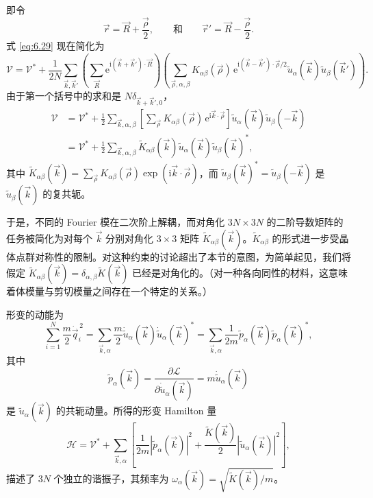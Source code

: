 
即令
\begin{equation*}
\vec r=\vec R+\frac{\vec\rho}2,\qquad\text{和}\qquad\vec r'=\vec R-\frac{\vec\rho}2.
\end{equation*}
式 \eqref{eq:6.29} 现在简化为
\begin{equation}\label{eq:6.30}
\mathcal V=\mathcal V^*+\frac1{2N}\sum_{\vec k,\vec k'}\left(\sum_{\vec R}\mathrm e^{\mathrm i(\vec k+\vec k')\cdot\vec R}\right)\left(\sum_{\vec\rho,\alpha,\beta}K_{\alpha\beta}(\vec\rho)\,\mathrm e^{\mathrm i(\vec k-\vec k')\cdot\vec\rho/2}\tilde u_\alpha(\vec k)\tilde u_\beta(\vec k')\right).
\end{equation}
由于第一个括号中的求和是 $N\delta_{\vec k+\vec k',0}$，
\begin{equation}\label{eq:6.31}
\begin{aligned}
\mathcal V&=\mathcal V^*+\frac12\sum_{\vec k,\alpha,\beta}\left[\sum_{\vec\rho}K_{\alpha\beta}(\vec\rho)\,\mathrm e^{\mathrm i\vec k\cdot\vec\rho}\right]\tilde u_\alpha(\vec k)\tilde u_\beta(-\vec k)\\
&=\mathcal V^*+\frac12\sum_{\vec k,\alpha,\beta}\tilde K_{\alpha\beta}(\vec k)\tilde u_\alpha(\vec k)\tilde u_\beta(\vec k)^*,
\end{aligned}
\end{equation}
其中 $\tilde K_{\alpha\beta}(\vec k)=\sum_{\vec\rho}K_{\alpha\beta}(\vec\rho)\exp(\mathrm i\vec k\cdot\vec\rho)$，而 $\tilde u_\beta(\vec k)^*=\tilde u_\beta(-\vec k)$ 是 $\tilde u_\beta(\vec k)$ 的复共轭。

于是，不同的 Fourier 模在二次阶上解耦，而对角化 $3N\times3N$ 的二阶导数矩阵的任务被简化为对每个 $\vec k$ 分别对角化 $3\times3$ 矩阵 $\tilde K_{\alpha\beta}(\vec k)$。$\tilde K_{\alpha\beta}$ 的形式进一步受晶体点群对称性的限制。对这种约束的讨论超出了本节的意图，为简单起见，我们将假定 $\tilde K_{\alpha\beta}(\vec k)=\delta_{\alpha,\beta}\tilde K(\vec k)$ 已经是对角化的。（对一种各向同性的材料，这意味着体模量与剪切模量之间存在一个特定的关系。）

形变的动能为
\begin{equation}\label{eq:6.32}
\sum_{i=1}^N\frac m2\dot{\vec q}_i^{\,2}=\sum_{\vec k,\alpha}\frac m2\dot{\tilde u}_\alpha(\vec k)\dot{\tilde u}_\alpha(\vec k)^*=\sum_{\vec k,\alpha}\frac1{2m}\tilde p_\alpha(\vec k)\tilde p_\alpha(\vec k)^*,
\end{equation}
其中
\begin{equation*}
\tilde p_\alpha(\vec k)=\frac{\partial\mathscr L}{\partial\dot{\tilde u}_\alpha(\vec k)}=m\dot{\tilde u}_\alpha(\vec k)
\end{equation*}
是 $\tilde u_\alpha(\vec k)$ 的共轭动量。所得的形变 Hamilton 量
\begin{equation}\label{eq:6.33}
\mathscr H=\mathcal V^*+\sum_{\vec k,\alpha}\left[\frac1{2m}\left|\tilde p_\alpha(\vec k)\right|^2+\frac{\tilde K(\vec k)}{2}\left|\tilde u_\alpha(\vec k)\right|^2\right],
\end{equation}
描述了 $3N$ 个独立的谐振子，其频率为 $\omega_\alpha(\vec k)=\sqrt{\tilde K(\vec k)/m}$。

